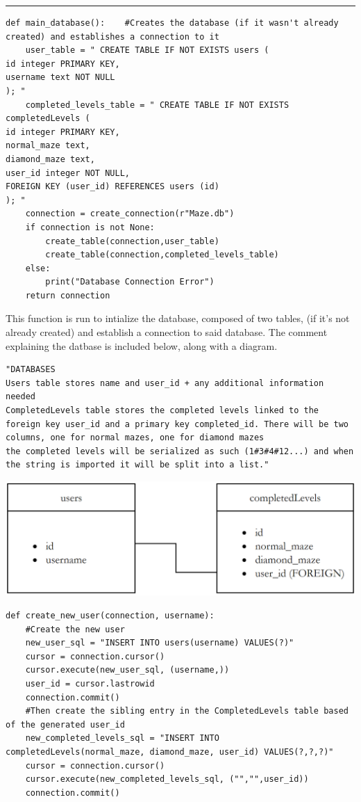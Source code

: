 \textcolor[RGB]{220,220,220}{\rule{\linewidth}{0.2pt}}
\begin{lstlisting}
def main_database():    #Creates the database (if it wasn't already created) and establishes a connection to it 
    user_table = " CREATE TABLE IF NOT EXISTS users (
id integer PRIMARY KEY,
username text NOT NULL
); "
    completed_levels_table = " CREATE TABLE IF NOT EXISTS completedLevels (
id integer PRIMARY KEY,
normal_maze text,
diamond_maze text,
user_id integer NOT NULL,
FOREIGN KEY (user_id) REFERENCES users (id)
); " 
    connection = create_connection(r"Maze.db")
    if connection is not None:
        create_table(connection,user_table)
        create_table(connection,completed_levels_table)
    else:
        print("Database Connection Error")
    return connection
\end{lstlisting}
This function is run to intialize the database, composed of two tables, (if it's not already created) and  establish a connection to said database.
The comment explaining the datbase is included below, along with a diagram.
\begin{lstlisting}
"DATABASES
Users table stores name and user_id + any additional information needed
CompletedLevels table stores the completed levels linked to the foreign key user_id and a primary key completed_id. There will be two columns, one for normal mazes, one for diamond mazes
the completed levels will be serialized as such (1#3#4#12...) and when the string is imported it will be split into a list."
\end{lstlisting}
\begin{center}
	\includegraphics[scale=0.5]{Database Diagram}
\end{center}
\begin{lstlisting}
def create_new_user(connection, username):
    #Create the new user
    new_user_sql = "INSERT INTO users(username) VALUES(?)"
    cursor = connection.cursor()
    cursor.execute(new_user_sql, (username,))
    user_id = cursor.lastrowid
    connection.commit()
    #Then create the sibling entry in the CompletedLevels table based of the generated user_id
    new_completed_levels_sql = "INSERT INTO completedLevels(normal_maze, diamond_maze, user_id) VALUES(?,?,?)"
    cursor = connection.cursor()
    cursor.execute(new_completed_levels_sql, ("","",user_id))
    connection.commit()
\end{lstlisting}
